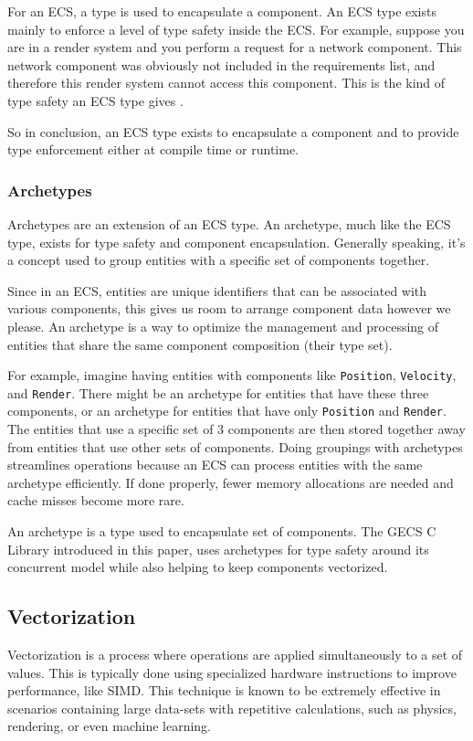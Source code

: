 For an ECS, a type is used to encapsulate a component. An ECS type exists mainly to enforce a level of type safety inside the ECS. For example, suppose you are in a render system and you perform a request for a network component. This network component was obviously not included in the requirements list, and therefore this render system cannot access this component. This is the kind of type safety an ECS type gives \cite{SanderMertensECS}.

So in conclusion, an ECS type exists to encapsulate a component and to provide type enforcement either at compile time or runtime.

\subsubsection{Archetypes}
Archetypes are an extension of an ECS type. An archetype, much like the ECS type, exists for type safety and component encapsulation. Generally speaking, it's a concept used to group entities with a specific set of components together.

Since in an ECS, entities are unique identifiers that can be associated with various components, this gives us room to arrange component data however we please. An archetype is a way to optimize the management and processing of entities that share the same component composition (their type set). 

For example, imagine having entities with components like \texttt{Position}, \texttt{Velocity}, and \texttt{Render}. There might be an archetype for entities that have these three components, or an archetype for entities that have only \texttt{Position} and \texttt{Render}. The entities that use a specific set of 3 components are then stored together away from entities that use other sets of components. Doing groupings with archetypes streamlines operations because an ECS can process entities with the same archetype efficiently. If done properly, fewer memory allocations are needed and cache misses become more rare. 

An archetype is a type used to encapsulate set of components. The GECS C Library introduced in this paper, uses archetypes for type safety around its concurrent model while also helping to keep components vectorized.

\subsection{Vectorization}
Vectorization is a process where operations are applied simultaneously to a set of values. This is typically done using specialized hardware instructions to improve performance, like SIMD. This technique is known to be extremely effective in scenarios containing large data-sets with repetitive calculations, such as physics, rendering, or even machine learning.  \cite{RomeoPHD}

